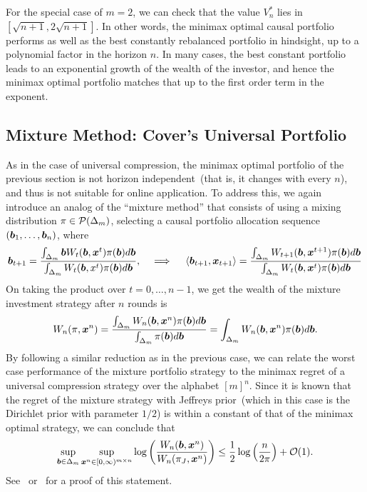 \documentclass[12pt]{article}
\begin{document}
\begin{remark}
    \label{remark:minimax-portfolio-value} For the special case of $m=2$, we can check that the value $V^*_n$ lies in $[\sqrt{n+1}, 2 \sqrt{n+1}]$. In other words, the minimax optimal causal portfolio performs as well as the best constantly rebalanced portfolio in hindsight, up to a polynomial factor in the horizon $n$. In many cases, the best constant portfolio leads to an exponential growth of the wealth of the investor, and hence the minimax optimal portfolio matches that up to the first order term in the exponent. 
\end{remark}
\subsection{Mixture Method: Cover's Universal Portfolio}
As in the case of universal compression, the minimax optimal portfolio of the previous section is not horizon independent~(that is, it changes with every $n$), and thus is not suitable for online application. To address this, we again introduce an analog of the ``mixture method'' that consists of using a mixing distribution $\pi\in {\cal P}(\Delta_m)$, selecting a causal portfolio allocation sequence $(\boldsymbol{b}_1, \ldots, \boldsymbol{b}_n)$, where 
\begin{align}
    \boldsymbol{b}_{t+1} = \frac{\int_{\Delta_m} \boldsymbol{b} W_t(\boldsymbol{b}, {\boldsymbol x}^t) \pi(\boldsymbol{b}) d\boldsymbol{b}}{\int_{\Delta_m} W_t(\boldsymbol{b}, x^t) \pi(\boldsymbol{b}) d\boldsymbol{b}}, \quad \implies \quad \langle \boldsymbol{b}_{t+1}, {\boldsymbol x}_{t+1} \rangle = \frac{\int_{\Delta_m} W_{t+1}(\boldsymbol{b}, {\boldsymbol x}^{t+1}) \pi(\boldsymbol{b}) d\boldsymbol{b} }{\int_{\Delta_{m}} W_t(\boldsymbol{b}, {\boldsymbol x}^t) \pi(\boldsymbol{b}) d\boldsymbol{b}}
\end{align}
On taking the product over $t=0, \ldots, n-1$, we get the wealth of the mixture investment strategy after $n$ rounds is 
\begin{align}
    W_n(\pi, {\boldsymbol x}^n) = \frac{ \int_{\Delta_m} W_n(\boldsymbol{b}, {\boldsymbol x}^n) \pi(\boldsymbol{b}) d\boldsymbol{b}}{\int_{\Delta_m} \pi(\boldsymbol{b}) d\boldsymbol{b} } = { \int_{\Delta_m} W_n(\boldsymbol{b}, {\boldsymbol x}^n) \pi(\boldsymbol{b}) d\boldsymbol{b}}. 
\end{align}
By following a similar reduction as in the previous case, we can relate the worst case performance of the mixture portfolio strategy to the minimax regret of a universal compression strategy over the alphabet $[m]^n$. Since it is known that the regret of the mixture strategy with Jeffreys prior~(which in this case is the Dirichlet prior with parameter $1/2$)  is within a constant of that of the minimax optimal strategy, we can conclude that 
\begin{align}
    \sup_{\boldsymbol{b} \in \Delta_m} \sup_{{\boldsymbol x}^n \in [0,\infty)^{m \times n}} \log\left( \frac{W_n(\boldsymbol{b}, {\boldsymbol x}^n)}{W_n(\pi_J, {\boldsymbol x}^n)} \right) \leq \frac{1}{2}\log \left( \frac{n}{2\pi} \right) + {\cal O}(1). 
\end{align}
See~\citet[Section~16.7.2]{cover2006elements} or~\citet{cover1996universal} for a proof of this statement. 
\end{document}
